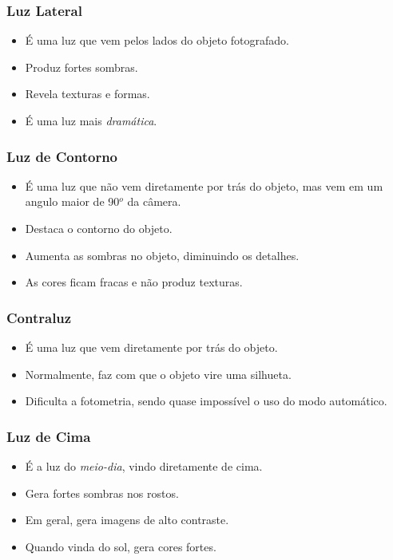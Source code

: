 \begin{frame}
  \frametitle{Luz Lateral}
  \begin{itemize}
    \item É uma luz que vem pelos lados do objeto fotografado.
    \item Produz fortes sombras.
    \item Revela texturas e formas.
    \item É uma luz mais \textit{dramática}.
  \end{itemize}
\end{frame}


\begin{frame}
  \frametitle{Luz de Contorno}
  \begin{itemize}
    \item É uma luz que não vem diretamente por trás do objeto, mas vem em um angulo maior de 90$^o$ da câmera.
    \item Destaca o contorno do objeto.
    \item Aumenta as sombras no objeto, diminuindo os detalhes.
    \item As cores ficam fracas e não produz texturas.
  \end{itemize}
\end{frame}


\begin{frame}
  \frametitle{Contraluz}
  \begin{itemize}
    \item É uma luz que vem diretamente por trás do objeto.
    \item Normalmente, faz com que o objeto vire uma silhueta.
    \item Dificulta a fotometria, sendo quase impossível o uso do modo automático.
  \end{itemize}
\end{frame}




\begin{frame}
  \frametitle{Luz de Cima}
  \begin{itemize}
    \item É a luz do \textit{meio-dia}, vindo diretamente de cima.
    \item Gera fortes sombras nos rostos.
    \item Em geral, gera imagens de alto contraste.
    \item Quando vinda do sol, gera cores fortes.
  \end{itemize}
\end{frame}

